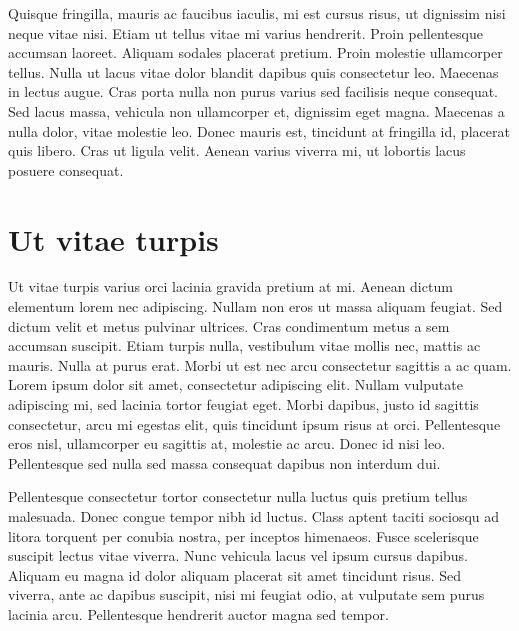Quisque fringilla, mauris ac faucibus iaculis, mi est cursus risus, ut dignissim
nisi neque vitae nisi. Etiam ut tellus vitae mi varius hendrerit. Proin
pellentesque accumsan laoreet. Aliquam sodales placerat pretium. Proin molestie
ullamcorper tellus. Nulla ut lacus vitae dolor blandit dapibus quis consectetur
leo. Maecenas in lectus augue. Cras porta nulla non purus varius sed facilisis
neque consequat. Sed lacus massa, vehicula non ullamcorper et, dignissim eget
magna. Maecenas a nulla dolor, vitae molestie leo. Donec mauris est, tincidunt
at fringilla id, placerat quis libero. Cras ut ligula velit. Aenean varius
viverra mi, ut lobortis lacus posuere consequat.

\section{Ut vitae turpis}
\label{section:lipsum:ut}

Ut vitae turpis varius orci lacinia gravida pretium at mi. Aenean dictum
elementum lorem nec adipiscing. Nullam non eros ut massa aliquam feugiat. Sed
dictum velit et metus pulvinar ultrices. Cras condimentum metus a sem accumsan
suscipit. Etiam turpis nulla, vestibulum vitae mollis nec, mattis ac mauris.
Nulla at purus erat. Morbi ut est nec arcu consectetur sagittis a ac quam. Lorem
ipsum dolor sit amet, consectetur adipiscing elit. Nullam vulputate adipiscing
mi, sed lacinia tortor feugiat eget. Morbi dapibus, justo id sagittis
consectetur, arcu mi egestas elit, quis tincidunt ipsum risus at orci.
Pellentesque eros nisl, ullamcorper eu sagittis at, molestie ac arcu. Donec id
nisi leo. Pellentesque sed nulla sed massa consequat dapibus non interdum dui.

Pellentesque consectetur tortor consectetur nulla luctus quis pretium tellus
malesuada. Donec congue tempor nibh id luctus. Class aptent taciti sociosqu ad
litora torquent per conubia nostra, per inceptos himenaeos. Fusce scelerisque
suscipit lectus vitae viverra. Nunc vehicula lacus vel ipsum cursus dapibus.
Aliquam eu magna id dolor aliquam placerat sit amet tincidunt risus. Sed
viverra, ante ac dapibus suscipit, nisi mi feugiat odio, at vulputate sem purus
lacinia arcu. Pellentesque hendrerit auctor magna sed tempor.

